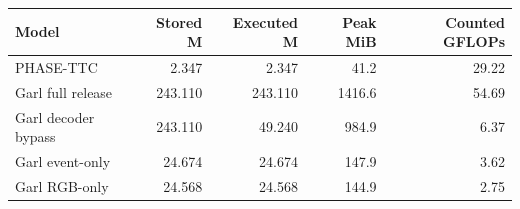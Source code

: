 \begin{tabular}{lrrrr}
\toprule
Model & Stored M & Executed M & Peak MiB & Counted GFLOPs \\
\midrule
PHASE-TTC & 2.347 & 2.347 & 41.2 & 29.22 \\
Garl full release & 243.110 & 243.110 & 1416.6 & 54.69 \\
Garl decoder bypass & 243.110 & 49.240 & 984.9 & 6.37 \\
Garl event-only & 24.674 & 24.674 & 147.9 & 3.62 \\
Garl RGB-only & 24.568 & 24.568 & 144.9 & 2.75 \\
\bottomrule
\end{tabular}
